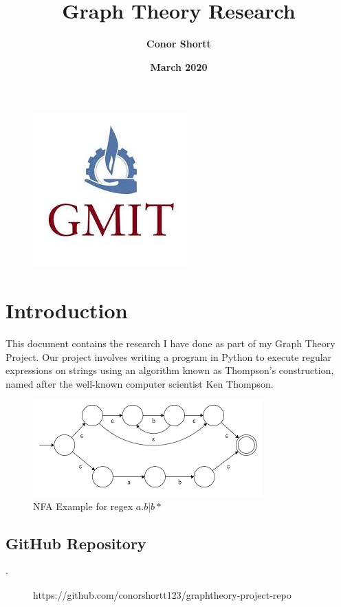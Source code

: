 \documentclass[12pt]{article}
\title{\textbf{Graph Theory Research}}
\author{\textbf{Conor Shortt}}
\date{\textbf{March 2020}}
\begin{document}
\maketitle
\begin{figure}[h!]
\centering
\includegraphics[scale=0.7]{Photos/logo.jpg}
\end{figure}
\pagebreak
\newpage

\newpage
\tableofcontents
\newpage

\section{Introduction}
This document contains the research I have done as part of my Graph Theory Project. Our project involves writing a program in Python to execute regular expressions on strings using an algorithm known as Thompson’s construction, named after the well-known computer scientist Ken Thompson.

\begin{figure}[h!]
\centering
\includegraphics[scale=1]{Photos/nfa.png}
\caption{NFA Example for regex $a.b|b*$}
\label{fig:nfa}
\end{figure}

\subsection{GitHub Repository}
\begin{description}
\item[$\cdot$]{https://github.com/conorshortt123/graphtheory-project-repo}
\end{description}
\end{document}
